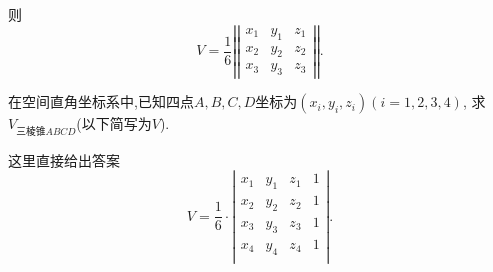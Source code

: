  则
 $$
 V=\frac{1}{6}
 \left|\left|
    \begin{array}{ccc}
      x_1&y_1&z_1\\
      x_2&y_2&z_2\\
      x_3&y_3&z_3
    \end{array}
  \right|\right|.
 $$
 \solend

 \prob 在空间直角坐标系中,已知四点$A,B,C,D
 \textrm{坐标为}(x_i,y_i,z_i)(i=1,2,3,4)$,
 求$V_{\textrm{三棱锥}ABCD}$(以下简写为$V$).

\sol 这里直接给出答案
$$
V=\frac{1}{6}\cdot
\left|
    \begin{array}{cccc}
      x_1&y_1&z_1&1\\
      x_2&y_2&z_2&1\\
      x_3&y_3&z_3&1\\
      x_4&y_4&z_4&1\\
    \end{array}
  \right|.
$$
\solend
